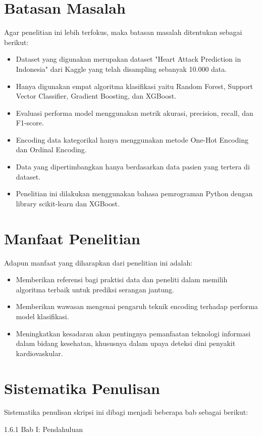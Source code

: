 \section{Batasan Masalah}
Agar penelitian ini lebih terfokus, maka batasan masalah ditentukan sebagai berikut:
\begin{itemize}
    \item Dataset yang digunakan merupakan dataset "Heart Attack Prediction in Indonesia" dari Kaggle yang telah disampling sebanyak 10.000 data.
    \item Hanya digunakan empat algoritma klasifikasi yaitu Random Forest, Support Vector Classifier, Gradient Boosting, dan XGBoost.
    \item Evaluasi performa model menggunakan metrik akurasi, precision, recall, dan F1-score.
    \item Encoding data kategorikal hanya menggunakan metode One-Hot Encoding dan Ordinal Encoding.
    \item Data yang dipertimbangkan hanya berdasarkan data pasien yang tertera di dataset.
    \item Penelitian ini dilakukan menggunakan bahasa pemrograman Python dengan library scikit-learn dan XGBoost.
\end{itemize}

\section{Manfaat Penelitian}
Adapun manfaat yang diharapkan dari penelitian ini adalah:
\begin{itemize}
    \item Memberikan referensi bagi praktisi data dan peneliti dalam memilih algoritma terbaik untuk prediksi serangan jantung.
    \item Memberikan wawasan mengenai pengaruh teknik encoding terhadap performa model klasifikasi.
    \item Meningkatkan kesadaran akan pentingnya pemanfaatan teknologi informasi dalam bidang kesehatan, khususnya dalam upaya deteksi dini penyakit kardiovaskular.
\end{itemize}

\section{Sistematika Penulisan}
Sistematika penulisan skripsi ini dibagi menjadi beberapa bab sebagai berikut:

    1.6.1 Bab I: Pendahuluan
    
